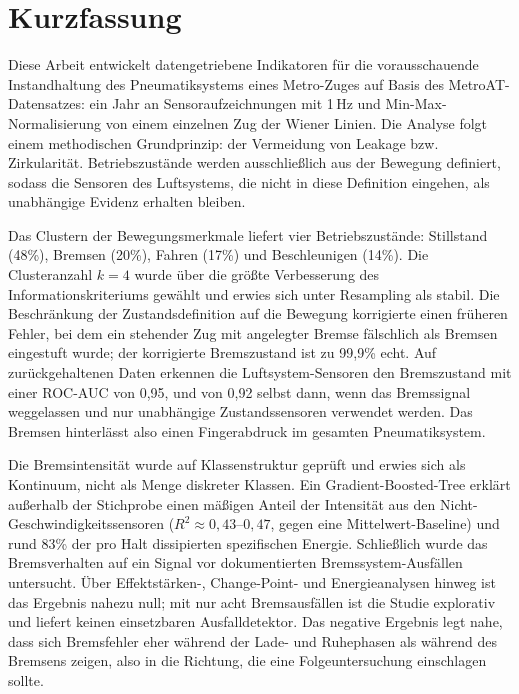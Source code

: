 \chapter*{Kurzfassung}

Diese Arbeit entwickelt datengetriebene Indikatoren für die vorausschauende Instandhaltung
des Pneumatiksystems eines Metro-Zuges auf Basis des MetroAT-Datensatzes: ein Jahr an
Sensoraufzeichnungen mit 1\,Hz und Min-Max-Normalisierung von einem einzelnen Zug der
Wiener Linien. Die Analyse folgt einem methodischen Grundprinzip: der Vermeidung von
Leakage bzw. Zirkularität. Betriebszustände werden ausschließlich aus der Bewegung
definiert, sodass die Sensoren des Luftsystems, die nicht in diese Definition eingehen, als
unabhängige Evidenz erhalten bleiben.

Das Clustern der Bewegungsmerkmale liefert vier Betriebszustände: Stillstand (48\%),
Bremsen (20\%), Fahren (17\%) und Beschleunigen (14\%). Die Clusteranzahl $k=4$ wurde über
die größte Verbesserung des Informationskriteriums gewählt und erwies sich unter
Resampling als stabil. Die Beschränkung der Zustandsdefinition auf die Bewegung korrigierte
einen früheren Fehler, bei dem ein stehender Zug mit angelegter Bremse fälschlich als
Bremsen eingestuft wurde; der korrigierte Bremszustand ist zu 99,9\% echt. Auf
zurückgehaltenen Daten erkennen die Luftsystem-Sensoren den Bremszustand mit einer ROC-AUC
von 0,95, und von 0,92 selbst dann, wenn das Bremssignal weggelassen und nur unabhängige
Zustandssensoren verwendet werden. Das Bremsen hinterlässt also einen Fingerabdruck im
gesamten Pneumatiksystem.

Die Bremsintensität wurde auf Klassenstruktur geprüft und erwies sich als Kontinuum, nicht
als Menge diskreter Klassen. Ein Gradient-Boosted-Tree erklärt außerhalb der Stichprobe
einen mäßigen Anteil der Intensität aus den Nicht-Geschwindigkeitssensoren
($R^2 \approx 0{,}43$--$0{,}47$, gegen eine Mittelwert-Baseline) und rund 83\% der pro Halt
dissipierten spezifischen Energie. Schließlich wurde das Bremsverhalten auf ein Signal vor
dokumentierten Bremssystem-Ausfällen untersucht. Über Effektstärken-, Change-Point- und
Energieanalysen hinweg ist das Ergebnis nahezu null; mit nur acht Bremsausfällen ist die
Studie explorativ und liefert keinen einsetzbaren Ausfalldetektor. Das negative Ergebnis
legt nahe, dass sich Bremsfehler eher während der Lade- und Ruhephasen als während des
Bremsens zeigen, also in die Richtung, die eine Folgeuntersuchung einschlagen sollte.
